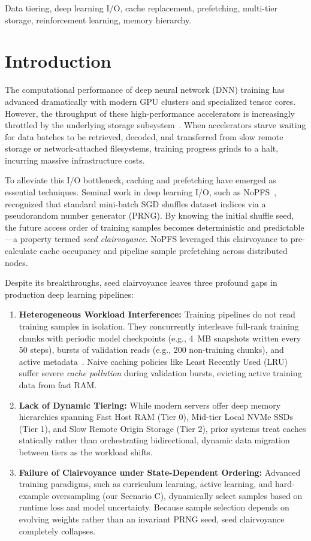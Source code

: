 \documentclass[conference]{IEEEtran}
\begin{document}
\begin{IEEEkeywords}
Data tiering, deep learning I/O, cache replacement, prefetching, multi-tier storage, reinforcement learning, memory hierarchy.
\end{IEEEkeywords}

\section{Introduction}
\label{sec:intro}
The computational performance of deep neural network (DNN) training has advanced dramatically with modern GPU clusters and specialized tensor cores. However, the throughput of these high-performance accelerators is increasingly throttled by the underlying storage subsystem~\cite{zhu2018deepio, coordl2021}. When accelerators starve waiting for data batches to be retrieved, decoded, and transferred from slow remote storage or network-attached filesystems, training progress grinds to a halt, incurring massive infrastructure costs.

To alleviate this I/O bottleneck, caching and prefetching have emerged as essential techniques. Seminal work in deep learning I/O, such as NoPFS~\cite{dryden2021clairvoyant}, recognized that standard mini-batch SGD shuffles dataset indices via a pseudorandom number generator (PRNG). By knowing the initial shuffle seed, the future access order of training samples becomes deterministic and predictable---a property termed \textit{seed clairvoyance}. NoPFS leveraged this clairvoyance to pre-calculate cache occupancy and pipeline sample prefetching across distributed nodes.

Despite its breakthroughs, seed clairvoyance leaves three profound gaps in production deep learning pipelines:
\begin{enumerate}
    \item \textbf{Heterogeneous Workload Interference:} Training pipelines do not read training samples in isolation. They concurrently interleave full-rank training chunks with periodic model checkpoints (e.g., 4~MB snapshots written every 50 steps), bursts of validation reads (e.g., 200 non-training chunks), and active metadata~\cite{megatron2020}. Naive caching policies like Least Recently Used (LRU) suffer severe \textit{cache pollution} during validation bursts, evicting active training data from fast RAM.
    \item \textbf{Lack of Dynamic Tiering:} While modern servers offer deep memory hierarchies spanning Fast Host RAM (Tier 0), Mid-tier Local NVMe SSDs (Tier 1), and Slow Remote Origin Storage (Tier 2), prior systems treat caches statically rather than orchestrating bidirectional, dynamic data migration between tiers as the workload shifts.
    \item \textbf{Failure of Clairvoyance under State-Dependent Ordering:} Advanced training paradigms, such as curriculum learning, active learning, and hard-example oversampling (our Scenario C), dynamically select samples based on runtime loss and model uncertainty. Because sample selection depends on evolving weights rather than an invariant PRNG seed, seed clairvoyance completely collapses.
\end{enumerate}
\end{document}
